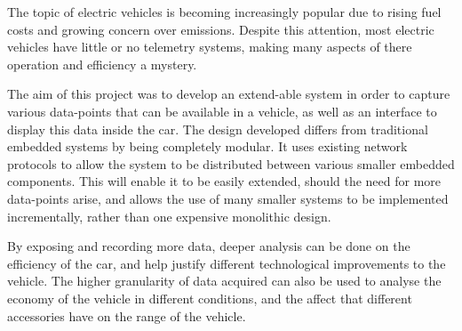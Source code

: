 


\begin{abstracts}        %

The topic of electric vehicles is becoming increasingly popular due to rising fuel costs and growing concern over emissions. Despite this attention, most electric vehicles have little or no telemetry systems, making many aspects of there operation and efficiency a mystery. 

The aim of this project was to develop an extend-able system in order to capture various data-points that can be available in a vehicle, as well as an interface to display this data inside the car. The design developed differs from traditional embedded systems by being completely modular. It uses existing network protocols to allow the system to be distributed between various smaller embedded components. This will enable it to be easily extended, should the need for more data-points arise, and allows the use of many smaller systems to be implemented incrementally, rather than one expensive monolithic design.

By exposing and recording more data, deeper analysis can be done on the efficiency of the car, and help justify different technological improvements to the vehicle. The higher granularity of data acquired can also be used to analyse the economy of the vehicle in different conditions, and the affect that different accessories have on the range of the vehicle.

\end{abstracts}


